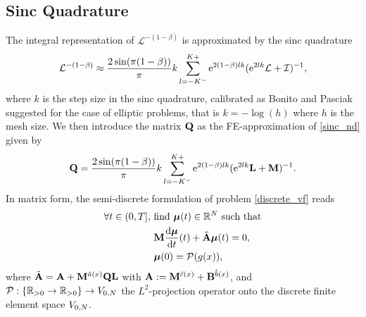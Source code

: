 \subsection{Sinc Quadrature} 
The integral representation of $\mathcal{L}^{-(1-\beta)}$ is approximated by the sinc quadrature\cite{Bonito}
\begin{equation} \label{sinc_nd}
\mathcal{L}^{-(1-\beta)} \approx \frac{2\sin(\pi(1-\beta))}{\pi} k \sum_{l=-K^-}^{K+} \text{e}^{2(1-\beta)lk}(\text{e}^{2lk}\mathcal{L}+\mathcal{I})^{-1},
\end{equation}
where $k$ is the step size in the sinc quadrature, calibrated as Bonito and Pasciak\cite{Bonito} suggested for the case of elliptic problems, that is $k = -\log(h)$ where $h$ is the mesh size.
We then introduce the matrix $\mathbf{Q}$ as the FE-approximation of \eqref{sinc_nd} given by
\begin{equation} \label{sinc_quad}
\mathbf{Q} = \frac{2\sin(\pi(1-\beta))}{\pi} k \sum_{l=-K^-}^{K+} \text{e}^{2(1-\beta)lk}(\text{e}^{2lk}\mathbf{L}+\mathbf{M})^{-1}.
\end{equation}
In matrix form, the semi-discrete formulation of problem \eqref{discrete_vf} reads
\begin{align*}
\begin{split}
\forall t \in (0,T],   \ &\text{find}  \ \bm{\mu}(t) \in \mathbb{R}^{N} \ \text{such that} \\ 
&\mathbf{M}\frac{\text{d}\bm{\mu}}{\text{d}t}(t) + \tilde{\mathbf{A}}\bm{\mu}(t) = 0, \\
&\bm{\mu}(0) = \mathcal{P}(g(x)),
\end{split}
\end{align*}
where $\tilde{\mathbf{A}} =  \mathbf{A} + \mathbf{M}^{\tilde{a}(x)}\mathbf{Q}\mathbf{L}$ with $ \mathbf{A} := \mathbf{M}^{\tilde{c}(x)} + \mathbf{B}^{\tilde{b}(x)}$, and $\mathcal{P}: \{\mathbb{R}_{>0} \to \mathbb{R}_{>0} \} \to V_{0,N}$ the $L^2$-projection operator onto the discrete finite element space $V_{0,N}$.

